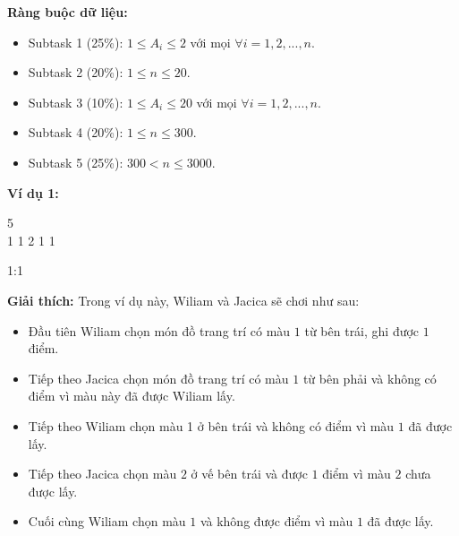 \documentclass[12pt]{scrartcl}  %
\begin{document}
\textbf{Ràng buộc dữ liệu:}
\begin{itemize}
    \item Subtask 1 (25\%): $1 \leq A_i \leq 2$ với mọi $\forall i = 1, 2, ..., n$.
    \item Subtask 2 (20\%): $1 \leq n \leq 20$.
    \item Subtask 3 (10\%): $1 \leq A_i \leq 20$ với mọi $\forall i = 1, 2, ..., n$.
    \item Subtask 4 (20\%): $1 \leq n \leq 300$.
    \item Subtask 5 (25\%): $300 < n \leq 3000$.
\end{itemize}

\textbf{Ví dụ 1:}
\begin{tcolorbox}[colback=gray!5!white, colframe=blue!50!black, title=Input]
5\\
1 1 2 1 1
\end{tcolorbox}
\begin{tcolorbox}[colback=gray!5!white, colframe=green!50!black, title=Output]
1:1
\end{tcolorbox}

\textbf{Giải thích:}
Trong ví dụ này, Wiliam và Jacica sẽ chơi như sau:
\begin{itemize}
    \item Đầu tiên Wiliam chọn món đồ trang trí có màu $1$ từ bên trái, ghi được $1$ điểm.
    \item Tiếp theo Jacica chọn món đồ trang trí có màu $1$ từ bên phải và không có điểm vì màu này đã được Wiliam lấy.
    \item Tiếp theo Wiliam chọn màu 1 ở bên trái và không có điểm vì màu $1$ đã được lấy. 
    \item Tiếp theo Jacica chọn màu $2$ ở vế bên trái và được $1$ điểm vì màu $2$ chưa được lấy.
    \item Cuối cùng Wiliam chọn màu $1$ và không được điểm vì màu $1$ đã được lấy.
\end{itemize}
\end{document}
